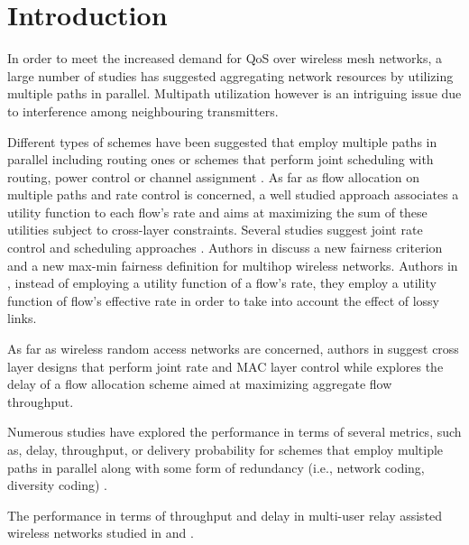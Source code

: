 \documentclass[conference]{IEEEtran}
\begin{document}
\section{Introduction}

In order to meet the increased demand for QoS over wireless mesh networks, a large number of studies has suggested aggregating network resources
by utilizing multiple paths in parallel. Multipath utilization however is an intriguing issue due to interference among neighbouring transmitters.

Different types of schemes have been suggested  that employ multiple paths in parallel including routing ones \cite{6133896}
or schemes that perform joint scheduling with routing, power control or channel assignment \cite{1717611,5501845,6130552}.
As far as flow allocation on multiple paths and rate control is concerned, a well studied approach associates a utility function to each flow's rate
and aims at maximizing the sum of these utilities subject to cross-layer constraints.
Several studies suggest joint rate control and scheduling approaches \cite{1430253, 4509706, conf_icc_QiuBX12}.
Authors in \cite{4712692} discuss a new fairness criterion and a new max-min fairness definition for multihop wireless networks.
Authors in \cite{5089987}, instead of employing a utility function of a flow's rate, they employ a utility function of flow's effective
rate in order to take into account the effect of lossy links.

As far as wireless random access networks are concerned, authors in \cite{1603389, Wang:2005:CRC:1062689.1062710} suggest cross layer designs that perform joint rate and MAC layer control
while \cite{7033238} explores the delay of a flow allocation scheme aimed at maximizing aggregate flow throughput.


Numerous studies have explored the performance in terms of several metrics, such as, delay, throughput, or delivery probability for schemes
that employ multiple paths in parallel along with some form of redundancy (i.e., network coding, diversity coding)
\cite{b:tsirig1, 6134700, 6335387, ref:papas_end_to_end, ref:papas_hop_by_hop}.

The performance in terms of throughput and delay in multi-user relay assisted wireless networks
studied in \cite{b:Pappas-arXiv-full-duplex} and \cite{b:Papadimitriou-arXiv}.
\end{document}

